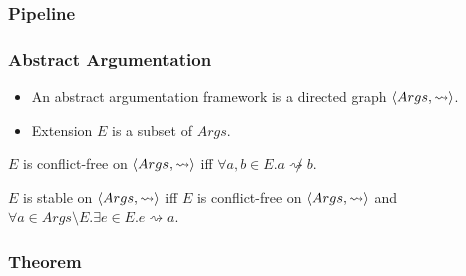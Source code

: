 \documentclass[11pt]{beamer}
\begin{document}
	\begin{frame}
		\frametitle{Pipeline}
		\resizebox{\textwidth}{!}{}
	\end{frame}

	\begin{frame}
		\frametitle{Abstract Argumentation}
		\begin{itemize}
			\item An abstract argumentation framework is a directed graph $\langle{Args},{\rightsquigarrow}\rangle$.
			\item Extension $E$ is a subset of $Args$.
		\end{itemize}
		
		\begin{definition}
			$E$ is conflict-free on $\langle{Args},{\rightsquigarrow}\rangle$ iff $\forall a,b\in E. a\not\rightsquigarrow b$.
		\end{definition}
	
		\begin{definition}
			$E$ is stable on $\langle{Args},{\rightsquigarrow}\rangle$ iff $E$ is conflict-free on $\langle{Args},{\rightsquigarrow}\rangle$ and $\forall a\in Args\setminus E.\exists e\in E.e\rightsquigarrow a$.
		\end{definition}
	\end{frame}

	\begin{frame}
		\frametitle{Theorem}
		\begin{center}
			\resizebox{0.9\textwidth}{!}{}		
		\end{center}
	\end{frame}
\end{document}
